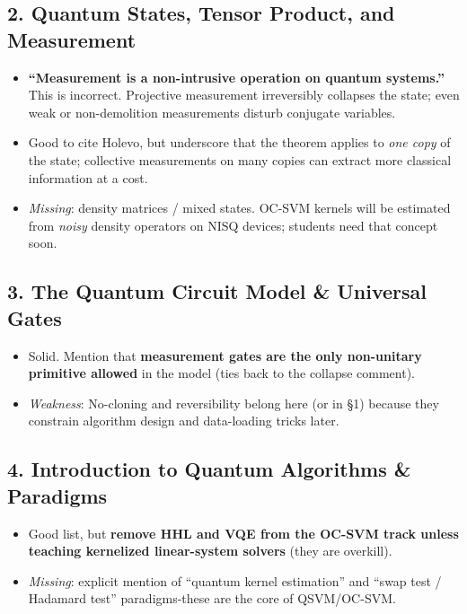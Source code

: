 \documentclass[11pt,a4paper]{article}
\begin{document}
	\subsection{2. Quantum States, Tensor Product, and Measurement}
	\begin{itemize}
		\item \textbf{“Measurement is a non-intrusive operation on quantum systems.”} This is incorrect. Projective measurement irreversibly collapses the state; even weak or non-demolition measurements disturb conjugate variables.
		\item Good to cite Holevo, but underscore that the theorem applies to \textit{one copy} of the state; collective measurements on many copies can extract more classical information at a cost.
		\item \textit{Missing}: density matrices / mixed states. OC-SVM kernels will be estimated from \textit{noisy} density operators on NISQ devices; students need that concept soon.
	\end{itemize}
	
	\subsection{3. The Quantum Circuit Model \& Universal Gates}
	\begin{itemize}
		\item Solid. Mention that \textbf{measurement gates are the only non-unitary primitive allowed} in the model (ties back to the collapse comment).
		\item \textit{Weakness}: No-cloning and reversibility belong here (or in §1) because they constrain algorithm design and data-loading tricks later.
	\end{itemize}
	
	\subsection{4. Introduction to Quantum Algorithms \& Paradigms}
	\begin{itemize}
		\item Good list, but \textbf{remove HHL and VQE from the OC-SVM track unless teaching kernelized linear-system solvers} (they are overkill).
		\item \textit{Missing}: explicit mention of “quantum kernel estimation” and “swap test / Hadamard test” paradigms-these are the core of QSVM/OC-SVM.
	\end{itemize}
	
\end{document}
